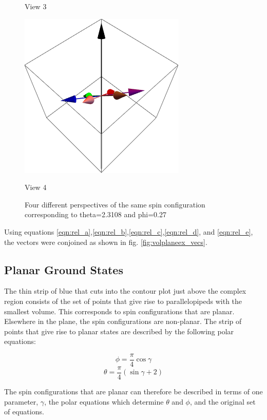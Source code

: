 \begin{figure}
\begin{minipage}[b]{0.5\linewidth}
    \caption{View 3} 
    \vspace{4ex}
  \end{minipage}%
  \begin{minipage}[b]{0.5\linewidth}
    \centering
    \includegraphics[width=.5\linewidth]{img/th2-3108_phi0-27_view4.png} 
    \caption{View 4} 
    \vspace{4ex}
  \end{minipage} 
  \caption{Four different perspectives of the same spin configuration corresponding to theta=2.3108 and phi=0.27}
\end{figure}

Using equations \eqref{eqn:rel_a},\eqref{eqn:rel_b},\eqref{eqn:rel_c},\eqref{eqn:rel_d}, and \eqref{eqn:rel_e}, the vectors were conjoined as shown in fig. \ref{fig:volplaneex_vecs}.

\clearpage
\subsection{Planar Ground States}

The thin strip of blue that cuts into the contour plot just above the complex region consists of the set of points that give rise to parallelopipeds with the smallest volume. This corresponds to spin configurations that are planar. Elsewhere in the plane, the spin configurations are non-planar. The strip of points that give rise to planar states are described by the following polar equations:

\begin{equation}
\phi = \frac{\pi}{4}\cos{\gamma} 
\end{equation}
\begin{equation}
\theta = \frac{\pi}{4}(\sin{\gamma}+2)
\end{equation}

The spin configurations that are planar can therefore be described in terms of one parameter, $\gamma$, the polar equations which determine $\theta$ and $\phi$, and the original set of equations.  

